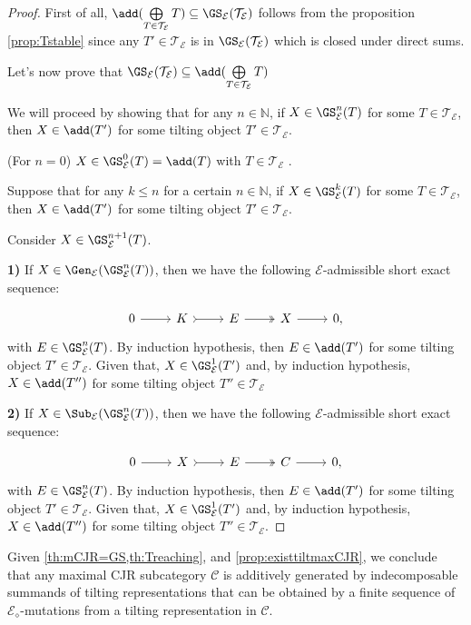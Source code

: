 \begin{proof}
First of all, $ \add(\bigoplus\limits_{T \in \mathcal{T}_\mathcal{E}} T) \subseteq  \GS_\mathcal{E}(\mathcal{T}_\mathcal{E})$ follows from the proposition \ref{prop:Tstable} since any $T' \in \mathcal{T}_\mathcal{E}$ is in $\GS_\mathcal{E}(\mathcal{T}_\mathcal{E})$ which is closed under direct sums.

\bigskip

Let's now prove that $\GS_\mathcal{E}(\mathcal{T}_\mathcal{E}) \subseteq \add(\bigoplus\limits_{T \in \mathcal{T}_\mathcal{E}} T)$

We will proceed by showing that for any $n \in \mathbb{N}$, if $X \in \GS^n_\mathcal{E}(T)$ for some $T \in \mathcal{T}_\mathcal{E}$, then $X \in \add(T')$ for some tilting object $T' \in \mathcal{T}_\mathcal{E}$.

\bigskip
(For $n=0$) $X \in \GS^0_\mathcal{E}(T) = \add(T)$ with $T \in \mathcal{T}_\mathcal{E}$ .

\bigskip
Suppose that for any $k \leq n$ for a certain $n \in \mathbb{N}$, if $X \in \GS^k_\mathcal{E}(T)$ for some $T \in \mathcal{T}_\mathcal{E}$, then $X \in \add(T')$ for some tilting object $T' \in \mathcal{T}_\mathcal{E}$.


\bigskip
Consider $X \in \GS^{n+1}_\mathcal{E}(T)$. 

\textbf{1)} If $X \in \Gen_\mathcal{E}(\GS^{n}_\mathcal{E}(T))$, then we have the following $\mathcal{E}$-admissible short exact sequence:

\[\begin{tikzcd}
	0 & K & E  & X &  0,
	\arrow[from=1-1, to=1-2]
	\arrow[tail, from=1-2, to=1-3]
	\arrow[two heads,from=1-3, to=1-4]
	\arrow[from=1-4, to=1-5]
\end{tikzcd} \] with $E \in \GS^{n}_\mathcal{E}(T)$. By induction hypothesis, then $E \in \add(T')$ for some tilting object $T' \in \mathcal{T}_\mathcal{E}$. Given that, $X \in \GS^{1}_\mathcal{E}(T')$ and, by induction hypothesis,  $X \in \add(T'')$ for some tilting object $T'' \in \mathcal{T}_\mathcal{E}$ 

\bigskip

\textbf{2)} If $X \in \Sub_\mathcal{E}(\GS^{n}_\mathcal{E}(T))$, then we have the following $\mathcal{E}$-admissible short exact sequence:

\[\begin{tikzcd}
	0 & X & E  & C &  0,
	\arrow[from=1-1, to=1-2]
	\arrow[tail, from=1-2, to=1-3]
	\arrow[two heads,from=1-3, to=1-4]
	\arrow[from=1-4, to=1-5]
\end{tikzcd} \] with $E \in \GS^{n}_\mathcal{E}(T)$. By induction hypothesis, then $E \in \add(T')$ for some tilting object $T' \in \mathcal{T}_\mathcal{E}$. Given that, $X \in \GS^{1}_\mathcal{E}(T')$ and, by induction hypothesis,  $X \in \add(T'')$ for some tilting object $T'' \in \mathcal{T}_\mathcal{E}$. 

\end{proof}

Given \cref{th:mCJR=GS,th:Treaching}, and \ref{prop:existtiltmaxCJR}, we conclude that any maximal CJR subcategory $\mathscr{C}$ is additively generated by indecomposable summands of tilting representations that can be obtained by a finite sequence of $\mathcal{E}_\diamond$-mutations from a tilting representation in $\mathscr{C}$. 

